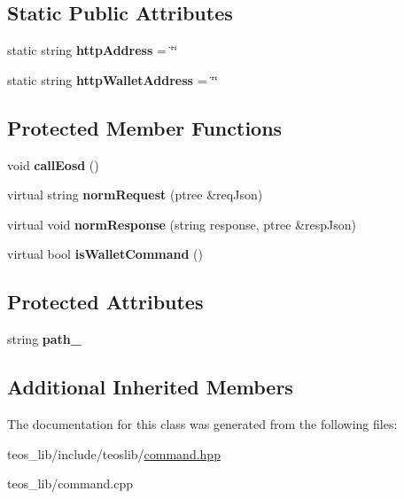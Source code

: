 \subsection*{Static Public Attributes}
\begin{DoxyCompactItemize}
\item 
\mbox{\label{classteos_1_1_teos_command_a54be6ca51cd5c3b55b4fd5506319fcaa}} 
static string {\bfseries http\+Address} = \char`\"{}\char`\"{}
\item 
\mbox{\label{classteos_1_1_teos_command_a3c420a38e2e983faab8a32d26c211a0d}} 
static string {\bfseries http\+Wallet\+Address} = \char`\"{}\char`\"{}
\end{DoxyCompactItemize}
\subsection*{Protected Member Functions}
\begin{DoxyCompactItemize}
\item 
\mbox{\label{classteos_1_1_teos_command_ac770c5eabcc7bfc6d4a8a8b2b0443458}} 
void {\bfseries call\+Eosd} ()
\item 
\mbox{\label{classteos_1_1_teos_command_abcdc20d75a8e8278cdcae8f0bb482515}} 
virtual string {\bfseries norm\+Request} (ptree \&req\+Json)
\item 
\mbox{\label{classteos_1_1_teos_command_afc2c37d50b3fda078ce3195d9922ab8e}} 
virtual void {\bfseries norm\+Response} (string response, ptree \&resp\+Json)
\item 
\mbox{\label{classteos_1_1_teos_command_a5f377d19a8bb692b2c3008d4b916a950}} 
virtual bool {\bfseries is\+Wallet\+Command} ()
\end{DoxyCompactItemize}
\subsection*{Protected Attributes}
\begin{DoxyCompactItemize}
\item 
\mbox{\label{classteos_1_1_teos_command_a263794bdfe8ef1ee2e01e8a5253495f9}} 
string {\bfseries path\+\_\+}
\end{DoxyCompactItemize}
\subsection*{Additional Inherited Members}


The documentation for this class was generated from the following files\+:\begin{DoxyCompactItemize}
\item 
teos\+\_\+lib/include/teoslib/\mbox{\hyperlink{command_8hpp}{command.\+hpp}}\item 
teos\+\_\+lib/command.\+cpp\end{DoxyCompactItemize}
